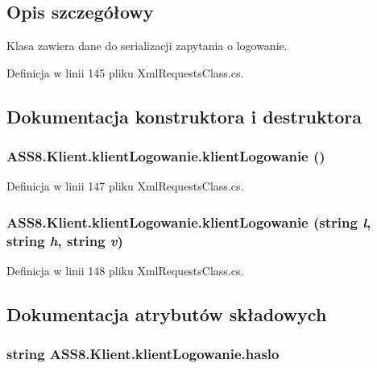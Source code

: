 \subsection{Opis szczegółowy}
Klasa zawiera dane do serializacji zapytania o logowanie. 



Definicja w linii 145 pliku XmlRequestsClass.cs.

\subsection{Dokumentacja konstruktora i destruktora}
\hypertarget{a00009_35b35cead7d9f58a9c114ca328012f32}{
\subsubsection[{klientLogowanie}]{\setlength{\rightskip}{0pt plus 5cm}ASS8.Klient.klientLogowanie.klientLogowanie ()}}
\label{da/da0/a00009_35b35cead7d9f58a9c114ca328012f32}




Definicja w linii 147 pliku XmlRequestsClass.cs.\hypertarget{a00009_be81e6b3b3e980fc92672d677ee97602}{
\subsubsection[{klientLogowanie}]{\setlength{\rightskip}{0pt plus 5cm}ASS8.Klient.klientLogowanie.klientLogowanie (string {\em l}, \/  string {\em h}, \/  string {\em v})}}
\label{da/da0/a00009_be81e6b3b3e980fc92672d677ee97602}




Definicja w linii 148 pliku XmlRequestsClass.cs.

\subsection{Dokumentacja atrybutów składowych}
\hypertarget{a00009_ee8fc634a45d3b1c48c0fda5de62aa8b}{
\subsubsection[{haslo}]{\setlength{\rightskip}{0pt plus 5cm}string {\bf ASS8.Klient.klientLogowanie.haslo}}}
\label{da/da0/a00009_ee8fc634a45d3b1c48c0fda5de62aa8b}




